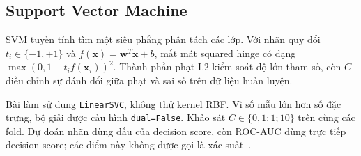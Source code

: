 \subsection{Support Vector Machine}
\label{subsec:2_4_2}
SVM tuyến tính tìm một siêu phẳng phân tách các lớp. Với nhãn quy đổi $t_i\in\{-1,+1\}$ và $f(\mathbf{x})=\mathbf{w}^{T}\mathbf{x}+b$, mất mát squared hinge có dạng $\max(0,1-t_i f(\mathbf{x}_i))^2$. Thành phần phạt L2 kiểm soát độ lớn tham số, còn $C$ điều chỉnh sự đánh đổi giữa phạt và sai số trên dữ liệu huấn luyện.

Bài làm sử dụng \texttt{LinearSVC}, không thử kernel RBF. Vì số mẫu lớn hơn số đặc trưng, bộ giải được cấu hình \texttt{dual=False}. Khảo sát $C\in\{0{,}1;1;10\}$ trên cùng các fold. Dự đoán nhãn dùng dấu của decision score, còn ROC-AUC dùng trực tiếp decision score; các điểm này không được gọi là xác suất~\cite{sklearn-linearsvc}.
